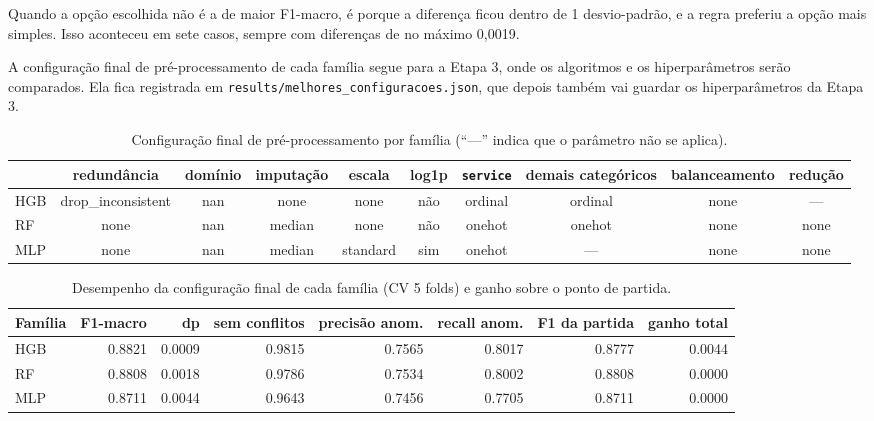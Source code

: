 \documentclass[11pt,a4paper]{article}
\begin{document}
Quando a opção escolhida não é a de maior F1-macro, é porque a diferença ficou dentro de 1 desvio-padrão, e a regra preferiu a opção mais simples. Isso aconteceu em sete casos, sempre com diferenças de no máximo 0,0019.

A configuração final de pré-processamento de cada família segue para a Etapa 3, onde os algoritmos e os hiperparâmetros serão comparados. Ela fica registrada em \texttt{results/melhores\_configuracoes.json}, que depois também vai guardar os hiperparâmetros da Etapa 3.

\begin{table}[H]
\centering
\caption{Configuração final de pré-processamento por família (``---'' indica que o parâmetro não se aplica).}
\begin{adjustbox}{max width=\linewidth}
\begin{tabular}{lccccccccc}
\toprule
 & redundância & domínio & imputação & escala & log1p & \texttt{service} & demais categóricos & balanceamento & redução \\
\midrule
HGB & drop\_inconsistent & nan & none & none & não & ordinal & ordinal & none & --- \\
RF & none & nan & median & none & não & onehot & onehot & none & none \\
MLP & none & nan & median & standard & sim & onehot & --- & none & none \\
\bottomrule
\end{tabular}
\end{adjustbox}
\end{table}

\begin{table}[H]
\centering
\caption{Desempenho da configuração final de cada família (CV 5 folds) e ganho sobre o ponto de partida.}
\begin{adjustbox}{max width=\linewidth}
\begin{tabular}{lrrrrrrr}
\toprule
Família & F1-macro & dp & sem conflitos & precisão anom. & recall anom. & F1 da partida & ganho total \\
\midrule
HGB & 0.8821 & 0.0009 & 0.9815 & 0.7565 & 0.8017 & 0.8777 & 0.0044 \\
RF & 0.8808 & 0.0018 & 0.9786 & 0.7534 & 0.8002 & 0.8808 & 0.0000 \\
MLP & 0.8711 & 0.0044 & 0.9643 & 0.7456 & 0.7705 & 0.8711 & 0.0000 \\
\bottomrule
\end{tabular}
\end{adjustbox}
\end{table}
\end{document}
